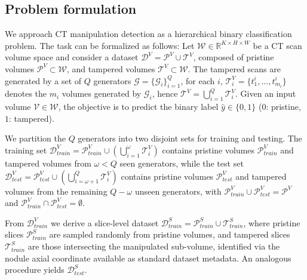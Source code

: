 \documentclass[sigconf, screen, review, anonymous]{acmart}
\begin{document}
\subsection{Problem formulation}
\label{sec:probl}
We approach CT manipulation detection as a hierarchical binary classification problem. The task can be formalized as follows: Let $\mathcal{W} \in \mathbb{R}^{K\times H\times W}$ be a CT scan volume space and consider a dataset $\mathcal{D}^V=\mathcal{P}^V\cup \mathcal{T}^V$, composed of pristine volumes $\mathcal{P}^V \subset \mathcal{W}$, and tampered volumes $\mathcal{T}^V \subset \mathcal{W}$. The tampered scans are generated by a set of $Q$ generators $\mathcal{G} = \{\mathcal{G}_i\}^{Q}_{i=1}$, for each $i$, $\mathcal{T}^V_i = \{t^i_1, \ldots, t^i_{m_i}\}$ denotes the $m_i$ volumes generated by $\mathcal{G}_i$, hence $\mathcal{T}^V = \bigcup_{i=1}^Q\mathcal{T}^V_i$. Given an input volume $\mathcal{V} \in \mathcal{W}$, the objective is to predict the binary label $\hat{y} \in \{0,1\}$ ($0$: pristine, $1$: tampered).

We partition the $Q$ generators into two disjoint sets for training and testing. The training set $\mathcal{D}^V_{train} = \mathcal{P}^V_{train} \cup (\bigcup_{i=1}^{\omega} \mathcal{T}^V_i)$ contains pristine volumes $\mathcal{P}^V_{train}$ and tampered volumes from $\omega < Q$ seen generators, while the test set $\mathcal{D}^V_{test} = \mathcal{P}^V_{test} \cup (\bigcup_{i=\omega+1}^{Q} \mathcal{T}^V_i)$ contains pristine volumes $\mathcal{P}^V_{test}$ and tampered volumes from the remaining $Q - \omega$ unseen generators, with $\mathcal{P}^V_{train} \cup \mathcal{P}^V_{test} = \mathcal{P}^V$ and $\mathcal{P}^V_{train} \cap \mathcal{P}^V_{test} = \emptyset$.

From $\mathcal{D}^V_{train}$ we derive a slice-level dataset $\mathcal{D}^{S}_{train} = \mathcal{P}^S_{train} \cup \mathcal{T}^S_{train}$, where pristine slices $\mathcal{P}^S_{train}$ are sampled randomly from pristine volumes, and tampered slices $\mathcal{T}^S_{train}$ are those intersecting the manipulated sub-volume, identified via the nodule axial coordinate available as standard dataset metadata. An analogous procedure yields $\mathcal{D}^{S}_{test}$.




\end{document}
